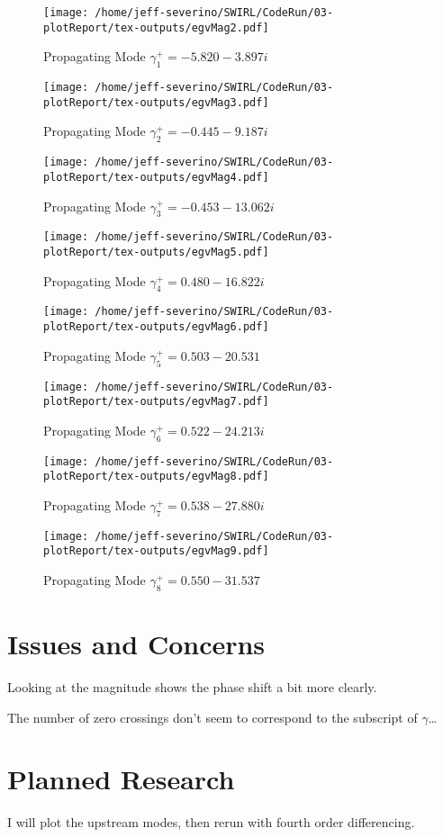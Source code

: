 \documentclass[a4paper]{article}
\begin{document}
 \begin{figure}
     \centering
     \texttt{[image: /home/jeff-severino/SWIRL/CodeRun/03-plotReport/tex-outputs/egvMag2.pdf]}
     \caption{Propagating Mode $\gamma^+_1 = -5.820-3.897i$}
 \end{figure}


 \begin{figure}
     \centering
     \texttt{[image: /home/jeff-severino/SWIRL/CodeRun/03-plotReport/tex-outputs/egvMag3.pdf]}
     \caption{Propagating Mode $\gamma^+_2 = -0.445-9.187i$}
 \end{figure}


 \begin{figure}
     \centering
     \texttt{[image: /home/jeff-severino/SWIRL/CodeRun/03-plotReport/tex-outputs/egvMag4.pdf]}
     \caption{Propagating Mode $\gamma^+_3 = -0.453-13.062i$}
 \end{figure}


 \begin{figure}
     \centering
     \texttt{[image: /home/jeff-severino/SWIRL/CodeRun/03-plotReport/tex-outputs/egvMag5.pdf]}
     \caption{Propagating Mode $\gamma^+_4 = 0.480 - 16.822i$}
 \end{figure}


 \begin{figure}
     \centering
     \texttt{[image: /home/jeff-severino/SWIRL/CodeRun/03-plotReport/tex-outputs/egvMag6.pdf]}
     \caption{Propagating Mode $\gamma^+_5 = 0.503 - 20.531$}
 \end{figure}


 \begin{figure}
     \centering
     \texttt{[image: /home/jeff-severino/SWIRL/CodeRun/03-plotReport/tex-outputs/egvMag7.pdf]}
     \caption{Propagating Mode $\gamma^+_6 = 0.522 - 24.213i$}
 \end{figure}

 \begin{figure}
     \centering
     \texttt{[image: /home/jeff-severino/SWIRL/CodeRun/03-plotReport/tex-outputs/egvMag8.pdf]}
     \caption{Propagating Mode $\gamma^+_7 = 0.538 - 27.880i$}
 \end{figure}


 \begin{figure}
     \centering
     \texttt{[image: /home/jeff-severino/SWIRL/CodeRun/03-plotReport/tex-outputs/egvMag9.pdf]}
     \caption{Propagating Mode $\gamma^+_8 = 0.550 - 31.537$}
 \end{figure}



\section{Issues and Concerns}
Looking at the magnitude shows the phase shift a bit more clearly. 

The number of zero crossings don't seem to correspond to the subscript of 
$\gamma$\ldots 

\section{Planned Research}

I will plot the upstream modes, then rerun with fourth order differencing.
\end{document}
